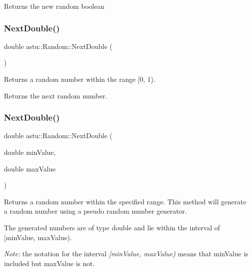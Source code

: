 \begin{DoxyReturn}{Returns}
the new random boolean 
\end{DoxyReturn}
\mbox{\label{classastu_1_1Random_afd6e22a3a407fc9db132178a0bd66179}} 
\subsubsection{\texorpdfstring{Next\+Double()}{NextDouble()}\hspace{0.1cm}{\footnotesize\ttfamily [1/2]}}
{\footnotesize\ttfamily double astu\+::\+Random\+::\+Next\+Double (\begin{DoxyParamCaption}{ }\end{DoxyParamCaption})}

Returns a random number within the range \mbox{[}0, 1).

\begin{DoxyReturn}{Returns}
the next random number. 
\end{DoxyReturn}
\mbox{\label{classastu_1_1Random_a5413d4f6db045cb272bee7f419847c6f}} 
\subsubsection{\texorpdfstring{Next\+Double()}{NextDouble()}\hspace{0.1cm}{\footnotesize\ttfamily [2/2]}}
{\footnotesize\ttfamily double astu\+::\+Random\+::\+Next\+Double (\begin{DoxyParamCaption}\item[{double}]{min\+Value,  }\item[{double}]{max\+Value }\end{DoxyParamCaption})}

Returns a random number within the specified range. This method will generate a random number using a pseudo random number generator.

The generated numbers are of type {\ttfamily double} and lie within the interval of \mbox{[}min\+Value, max\+Value).

{\itshape Note\+:} the notation for the interval {\itshape \mbox{[}min\+Value, max\+Value)} means that {\ttfamily min\+Value} is included but {\ttfamily max\+Value} is not.


